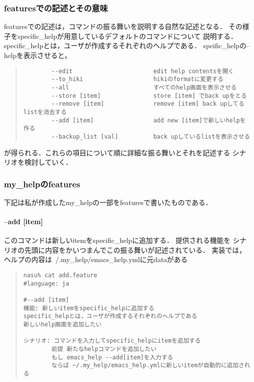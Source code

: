 
\subsubsection{featuresでの記述とその意味}
featuresでの記述は，コマンドの振る舞いを説明する自然な記述となる．
その様子をspecific\_helpが用意しているデフォルトのコマンドについて
説明する．specific\_helpとは，ユーザが作成するそれぞれのヘルプである．
speific\_helpの--helpを表示させると，
\begin{quote}\begin{verbatim}
        --edit                       edit help contentsを開く
        --to_hiki                    hikiのformatに変更する
        --all                        すべてのhelp画面を表示させる
        --store [item]               store [item] でback upをとる
        --remove [item]              remove [item] back upしてるlistを消去する
        --add [item]                 add new [item]で新しいhelpを作る
        --backup_list [val]          back upしているlistを表示させる
\end{verbatim}\end{quote}
が得られる．これらの項目について順に詳細な振る舞いとそれを記述する
シナリオを検討していく．

\subsubsection{my\_helpのfeatures}
下記は私が作成したmy\_helpの一部をfeaturesで書いたものである．

\paragraph{--add [item]}
このコマンドは新しいitemをspecific\_helpに追加する．
提供される機能を
シナリオの先頭に内容をかいつまんでこの振る舞いが記述されている．
実装では，ヘルプの内容は~/.my\_help/emacs\_help.ymlに元dataがある
\begin{quote}\begin{verbatim}
nasu% cat add.feature
#language: ja

#--add [item]
機能: 新しいitemをspecific_helpに追加する
specific_helpとは，ユーザが作成するそれぞれのヘルプである
新しいhelp画面を追加したい

シナリオ: コマンドを入力してspecific_helpにitemを追加する
        前提 新たなhelpコマンドを追加したい
        もし emacs_help --add[item]を入力する
        ならば ~/.my_help/emacs_help.ymlに新しいitemが自動的に追加される

\end{verbatim}\end{quote}

